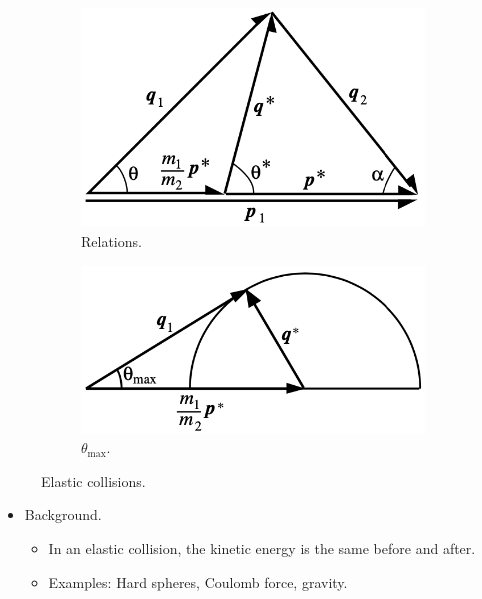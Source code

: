 \documentclass[../notes.tex]{subfiles}
\begin{document}
\begin{itemize}
\begin{figure}[h!]
\begin{subfigure}[b]{0.35\linewidth}
        \end{subfigure}\\[1em]
        \begin{subfigure}[b]{0.35\linewidth}
            \centering
            \includegraphics[width=0.9\linewidth]{../ExtFiles/CMelasticc.png}
            \caption{Relations.}
            \label{fig:CMelasticc}
        \end{subfigure}
        \begin{subfigure}[b]{0.35\linewidth}
            \centering
            \includegraphics[width=0.95\linewidth]{../ExtFiles/CMelasticd.png}
            \caption{$\theta_\text{max}$.}
            \label{fig:CMelasticd}
        \end{subfigure}
        \caption{Elastic collisions.}
        \label{fig:CMelastic}
    \end{figure}
    \begin{itemize}
        \item Background.
        \begin{itemize}
            \item In an elastic collision, the kinetic energy is the same before and after.
            \item Examples: Hard spheres, Coulomb force, gravity.

\end{itemize}
\end{itemize}
\end{itemize}
\end{document}
